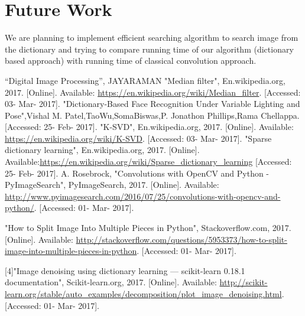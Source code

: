 \documentclass[journal]{IEEEtran}
\begin{document}
	
    \section{\textbf{Future Work}}
    We are planning to implement efficient searching algorithm to search image from the dictionary and trying to compare running time of our algorithm (dictionary based approach) with running time of classical convolution approach.
	
	
	\begin{thebibliography}{8}
	“Digital Image Processing”, JAYARAMAN
	"Median filter", En.wikipedia.org, 2017. [Online]. Available: \url{https://en.wikipedia.org/wiki/Median_filter}. [Accessed: 03- Mar- 2017].
	"Dictionary-Based Face Recognition Under Variable
	Lighting and Pose",Vishal M. Patel,TaoWu,SomaBiswas,P. Jonathon Phillips,Rama Chellappa.[Accessed: 25- Feb- 2017].
   "K-SVD", En.wikipedia.org, 2017. [Online]. Available: \url{https://en.wikipedia.org/wiki/K-SVD}. [Accessed: 03- Mar- 2017].	
"Sparse dictionary learning", En.wikipedia.org, 2017. [Online]. Available:\url{https://en.wikipedia.org/wiki/Sparse_dictionary_learning}	[Accessed: 25- Feb- 2017].
A.  Rosebrock, "Convolutions with OpenCV and Python - PyImageSearch", PyImageSearch, 2017. [Online]. Available:\url{ http://www.pyimagesearch.com/2016/07/25/convolutions-with-opencv-and-python/}. [Accessed: 01- Mar- 2017].

"How to Split Image Into Multiple Pieces in Python", Stackoverflow.com, 2017. [Online]. Available: \url{http://stackoverflow.com/questions/5953373/how-to-split-image-into-multiple-pieces-in-python}. [Accessed: 01- Mar- 2017].

[4]"Image denoising using dictionary learning — scikit-learn 0.18.1 documentation", Scikit-learn.org, 2017. [Online]. Available: \url{http://scikit-learn.org/stable/auto_examples/decomposition/plot_image_denoising.html}. [Accessed: 01- Mar- 2017].

	
	\end{thebibliography}
	
	
	
\end{document}
